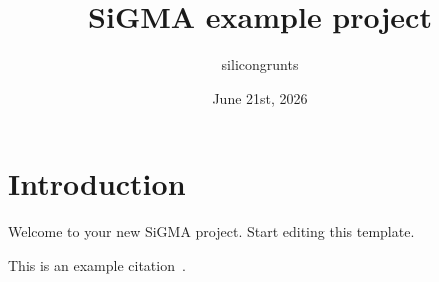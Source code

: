\documentclass[11pt,a4paper]{article}
\title{SiGMA example project}
\author{silicongrunts}
\date{June 21st, 2026}
\begin{document}
\maketitle

\section{Introduction}

Welcome to your new SiGMA project. Start editing this template.

This is an example citation~\cite{example2024}.



\end{document}
